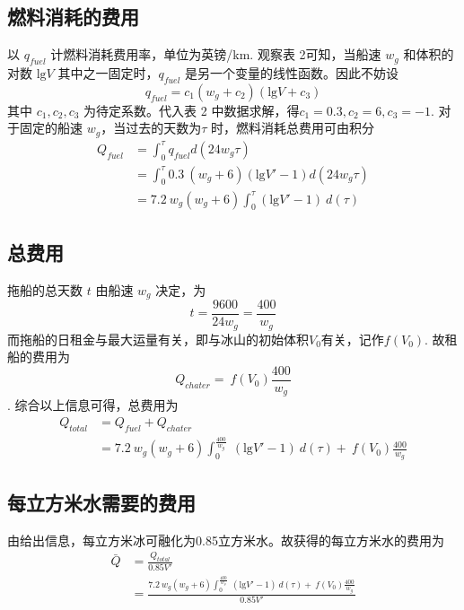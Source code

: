 \documentclass[a4paper,12pt,onecolumn,twoside]{article}
\begin{document}
\subsection{燃料消耗的费用}
以 $q_{fuel}$ 计燃料消耗费用率，单位为英镑/km. 观察表 2可知，当船速 $w_{g}$ 和体积的对数 $\text{lg}V$ 其中之一固定时，$q_{fuel}$ 是另一个变量的线性函数。因此不妨设
\begin{equation}
	q_{fuel}=c_{1}(w_{g}+c_{2})(\text{lg}V+c_{3})
\end{equation}
其中 $c_{1},c_{2},c_{3}$ 为待定系数。代入表 2 中数据求解，得$c_{1}=0.3,c_{2}=6,c_{3}=-1$. 对于固定的船速 $w_{g}$，当过去的天数为$\tau$ 时，燃料消耗总费用可由积分
\begin{equation}
	\begin{aligned}
	Q_{fuel}&=\int_{0}^{\tau}q_{fuel}d(24w_{g}\tau)\\
	&=\int_{0}^{\tau}0.3~(w_{g}+6)(\text{lg}V\prime-1)d(24w_{g}\tau)\\
	&=7.2~w_{g}(w_{g}+6)\int_{0}^{\tau}(\text{lg}V\prime-1)~d(\tau)
	\end{aligned}
\end{equation}
\subsection{总费用}
拖船的总天数 $t$ 由船速 $w_{g}$ 决定，为 $$t=\frac{9600}{24w_{g}}=\frac{400}{w_{g}}$$而拖船的日租金与最大运量有关，即与冰山的初始体积$V_{0}$有关，记作$f(V_{0})$. 故租船的费用为$$Q_{chater}=~f(V_{0})\frac{400}{w_{g}}$$.
综合以上信息可得，总费用为
\begin{equation}
	\begin{aligned}
	Q_{total}&=Q_{fuel}+Q_{chater}\\
	&=7.2~w_{g}(w_{g}+6)\int_{0}^{\frac{400}{w_{g}}}~(\text{lg}V\prime-1)~d(\tau)+~f(V_{0})\frac{400}{w_{g}}
	\end{aligned}
\end{equation}
\subsection{每立方米水需要的费用}
由给出信息，每立方米冰可融化为0.85立方米水。故获得的每立方米水的费用为
\begin{equation}
	\begin{aligned}
	\bar{Q}&=\frac{Q_{total}}{0.85V\prime}\\
	&=\frac{7.2~w_{g}(w_{g}+6)\int_{0}^{\frac{400}{w_{g}}}~(\text{lg}V\prime-1)~d(\tau)+~f(V_{0})\frac{400}{w_{g}}}{0.85V\prime}
	\end{aligned}
\end{equation}
\end{document}
